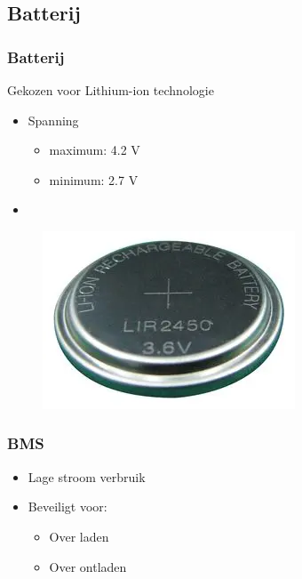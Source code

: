     \subsection{Batterij}
    \begin{frame}
        \frametitle{Batterij}
        Gekozen voor Lithium-ion technologie
        \begin{itemize}
            \item Spanning 
            \begin{itemize}
                \item maximum: 4.2 V 
                \item minimum: 2.7 V
            \end{itemize}
            \item 
        \end{itemize}
        \begin{figure}[h]
            \raggedleft
            \includegraphics[scale=0.15]{img/batterij.png}
        \end{figure}
    \end{frame}
        

    \begin{frame}
        \frametitle{BMS}
        
        \begin{itemize}
            \item Lage stroom verbruik
            \item Beveiligt voor:
                \begin{itemize}
                    \item Over laden
                    \item Over ontladen
                \end{itemize}
            
        \end{itemize}
        
        
    
    \end{frame}

